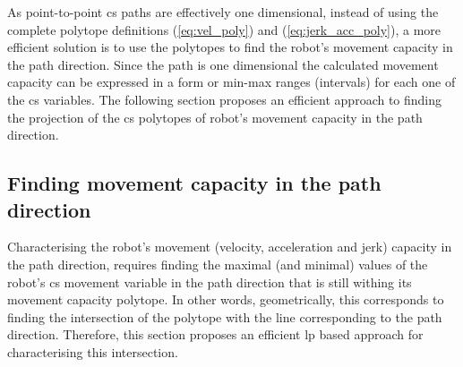 As point-to-point \gls{cs} paths are effectively one dimensional, instead of using the complete polytope definitions (\ref{eq:vel_poly}) and (\ref{eq:jerk_acc_poly}), a more efficient solution is to use the polytopes to find the robot's movement capacity in the path direction. Since the path is one dimensional the calculated movement capacity can be expressed in a form or min-max ranges (intervals) for each one of the \gls{cs} variables. 
The following section proposes an efficient approach to finding the projection of the \gls{cs} polytopes of robot's movement capacity in the path direction.

\subsection{Finding movement capacity in the path direction}
\label{ch:capacity_lp}

Characterising the robot's movement (velocity, acceleration and jerk) capacity in the path direction, requires finding the maximal (and minimal) values of the robot's \gls{cs} movement variable in the path direction that is still withing its movement capacity polytope. In other words, geometrically, this corresponds to finding the intersection of the polytope with the line corresponding to the path direction. Therefore, this section proposes an efficient \gls{lp} based approach for characterising this intersection.

